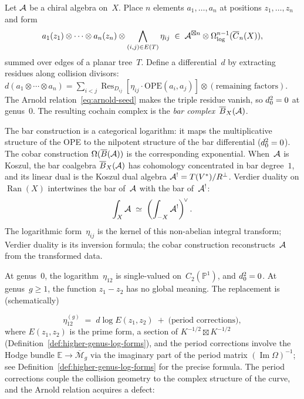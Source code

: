 Let $\mathcal{A}$ be a chiral algebra on~$X$.  Place $n$ elements
$a_1, \ldots, a_n$ at positions $z_1, \ldots, z_n$ and form
\begin{equation}\label{eq:bar-element-intro}
a_1(z_1) \otimes \cdots \otimes a_n(z_n)
\otimes \bigwedge_{(i,j) \in E(T)} \eta_{ij}
\;\in\;
\mathcal{A}^{\boxtimes n} \otimes
\Omega^{n-1}_{\log}(\overline{C}_n(X)),
\end{equation}
summed over edges of a planar tree~$T$.  Define a differential~$d$
by extracting residues along collision divisors:
$d(a_1 \otimes \cdots \otimes a_n) = \sum_{i < j}
\operatorname{Res}_{D_{ij}}[\eta_{ij} \cdot
\text{OPE}(a_i, a_j)] \otimes (\text{remaining factors})$.
The Arnold relation~\eqref{eq:arnold-seed} makes the triple
residue vanish, so $d_0^2 = 0$ at genus~$0$.  The resulting cochain complex is
the \emph{bar complex}~$\overline{B}_X(\mathcal{A})$.

The bar construction is a categorical logarithm: it maps the
multiplicative structure of the OPE to the nilpotent structure
of the bar differential ($d_0^2 = 0$).  The cobar construction
$\Omega(\overline{B}(\mathcal{A}))$ is the corresponding exponential.
When~$\mathcal{A}$ is Koszul, the bar coalgebra $\overline{B}_X(\mathcal{A})$ has cohomology
concentrated in bar degree~$1$, and its linear dual is the Koszul dual
algebra $\mathcal{A}^! = T(V^*)/R^\perp$.  Verdier duality on
$\operatorname{Ran}(X)$ intertwines the bar of~$\mathcal{A}$ with the bar
of~$\mathcal{A}^!$:
\begin{equation}\label{eq:NAP-intro}
\int_X \mathcal{A} \;\simeq\;
\left(\int_{-X} \mathcal{A}^!\right)^{\!\vee}.
\end{equation}
The logarithmic form~$\eta_{ij}$ is the kernel of this non-abelian
integral transform; Verdier duality is its inversion formula;
the cobar construction reconstructs~$\mathcal{A}$ from the transformed data.

At genus~$0$, the logarithm~$\eta_{12}$ is single-valued
on~$C_2(\mathbb{P}^1)$, and $d_0^2 = 0$.  At
genus~$g \geq 1$, the function $z_1 - z_2$ has no global meaning.
The replacement is (schematically)

\begin{equation}\label{eq:genus-g-propagator-intro-ch0}
\eta_{12}^{(g)} \;=\; d\log E(z_1, z_2)
\;+\; \text{(period corrections)},
\end{equation}
where $E(z_1,z_2)$ is the prime form, a section of $K^{-1/2} \boxtimes K^{-1/2}$
(Definition~\ref{def:higher-genus-log-forms}), and the period corrections
involve the Hodge bundle $\mathbb{E} \to \overline{\mathcal{M}}_g$
via the imaginary part of the period matrix
$(\operatorname{Im}\Omega)^{-1}$; see Definition~\ref{def:higher-genus-log-forms}
for the precise formula.
The period corrections couple the collision geometry to the complex
structure of the curve, and the Arnold relation acquires a defect:

